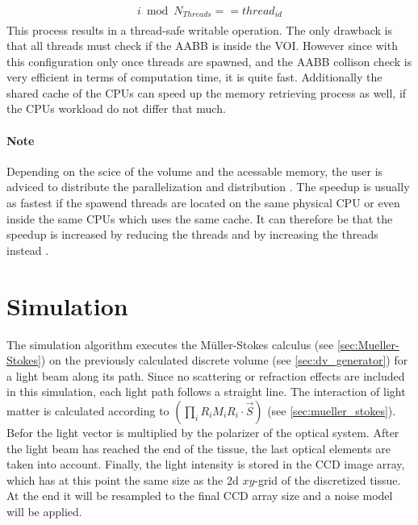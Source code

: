 %
\begin{align}
\begin{split}
    i \bmod N_{\mathit{Threads}} == \mathit{thread}_{\mathit{id}}
\end{split}
\end{align}
%
This process results in a thread-safe writable operation.
The only drawback is that all threads must check if the \ac{AABB} is inside the \ac{VOI}.
However since with this configuration only once threads are spawned, and the \ac{AABB} collison check is very efficient in terms of computation time, it is quite fast.
Additionally the shared cache of the \acp{CPU} can speed up the memory retrieving process as well, if the \acp{CPU} workload do not differ that much.
\par
\paragraph{Note}
Depending on the scice of the volume and the acessable memory, the user is adviced to distribute the \openmp{} parallelization and \mpi{} distribution \dummy{}.
The \openmp{} speedup is usually as fastest if the spawend threads are located on the same physical \ac{CPU} or even inside the same \acp{CPU} which uses the same cache.
It can therefore be that the speedup is increased by reducing the \openmp{} threads and by increasing the \mpi{} threads instead .
%
%
%
\section{Simulation}
\label{sec:simulation}
%
The simulation algorithm executes the M\"uller-Stokes calculus (see \cref{sec:Mueller-Stokes}) on the previously calculated discrete volume (see \cref{sec:dv_generator}) for a light beam along its path.
Since no scattering or refraction effects are included in this simulation, each light path follows a straight line.
The interaction of light matter is calculated according to $\left( \prod_i R_i M_i R_i \cdot \vec{S} \right)$ (see \cref{sec:mueller_stokes}).
Befor the light vector is multiplied by the polarizer of the optical system.
After the light beam has reached the end of the tissue, the last optical elements are taken into account.
Finally, the light intensity is stored in the \acs{CCD} image array, which has at this point the same size as the 2d $xy$-grid of the discretized tissue.
At the end it will be resampled to the final \ac{CCD} array size and a noise model will be applied.
%
%
